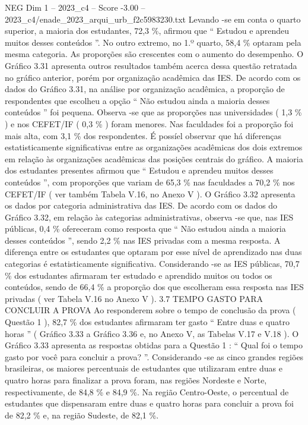 \begin{textsample}{NEG Dim 1 – 2023\_c4 – Score -3.00 – 2023\_c4/enade\_2023\_arqui\_urb\_f2c5983230.txt}
Levando -se em conta o quarto superior, a maioria dos estudantes, 72,3 \%, afirmou que “ Estudou e aprendeu muitos desses conteúdos ”.
No outro extremo, no 1.º quarto, 58,4 \% optaram pela mesma categoria.
As proporções são crescentes com o aumento do desempenho.
O Gráfico 3.31 apresenta outros resultados também acerca dessa questão retratada no gráfico anterior, porém por organização acadêmica das IES.
De acordo com os dados do Gráfico 3.31, na análise por organização acadêmica, a proporção de respondentes que escolheu a opção “ Não estudou ainda a maioria desses conteúdos ” foi pequena.
Observa -se que as proporções nas universidades ( 1,3 \% ) e nos CEFET/IF ( 0,3 \% ) foram menores.
Nas faculdades foi a proporção foi mais alta, com 3,1 \% dos respondentes.
É possíel observar que há diferenças estatisticamente significativas entre as organizações acadêmicas dos dois extremos em relação às organizações acadêmicas das posições centrais do gráfico.
A maioria dos estudantes presentes afirmou que “ Estudou e aprendeu muitos desses conteúdos ”, com proporções que variam de 65,3 \% nas faculdades a 70,2 \% nos CEFET/IF ( ver também Tabela V.16, no Anexo V ).
O Gráfico 3.32 apresenta os dados por categoria administrativa das IES.
De acordo com os dados do Gráfico 3.32, em relação às categorias administrativas, observa -se que, nas IES públicas, 0,4 \% ofereceram como resposta que “ Não estudou ainda a maioria desses conteúdos ”, sendo 2,2 \% nas IES privadas com a mesma resposta.
A diferença entre os estudantes que optaram por esse nível de aprendizado nas duas categorias é estatisticamente significativa.
Considerando -se as IES públicas, 70,7 \% dos estudantes afirmaram ter estudado e aprendido muitos ou todos os conteúdos, sendo de 66,4 \% a proporção dos que escolheram essa resposta nas IES privadas ( ver Tabela V.16 no Anexo V ). 3.7 TEMPO GASTO PARA CONCLUIR A PROVA Ao responderem sobre o tempo de conclusão da prova ( Questão 1 ), 82,7 \% dos estudantes afirmaram ter gasto “ Entre duas e quatro horas ” ( Gráfico 3.33 a Gráfico 3.36 e, no Anexo V, as Tabelas V.17 e V.18 ).
O Gráfico 3.33 apresenta as respostas obtidas para a Questão 1 : “ Qual foi o tempo gasto por você para concluir a prova? ”.
Considerando -se as cinco grandes regiões brasileiras, os maiores percentuais de estudantes que utilizaram entre duas e quatro horas para finalizar a prova foram, nas regiões Nordeste e Norte, respectivamente, de 84,8 \% e 84,9 \%.
Na região Centro-Oeste, o percentual de estudantes que dispensaram entre duas e quatro horas para concluir a prova foi de 82,2 \% e, na região Sudeste, de 82,1 \%.

\end{textsample}
